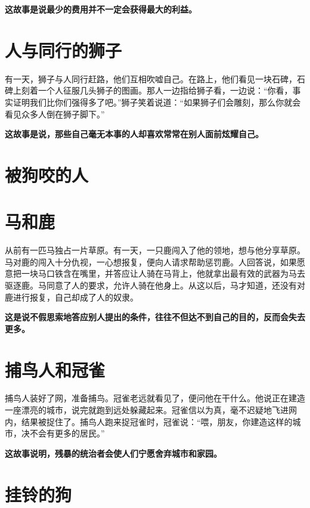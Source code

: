 {\bfseries \color{red}这故事是说最少的费用并不一定会获得最大的利益。}

\section{人与同行的狮子}

有一天，狮子与人同行赶路，他们互相吹嘘自己。在路上，他们看见一块石碑，石碑上刻着一个人征服几头狮子的图画。那人一边指给狮子看，一边说：“你看，事实证明我们比你们强得多了吧。”狮子笑着说道：“如果狮子们会雕刻，那么你就会看见众多人倒在狮子脚下。”

{\bfseries \color{red}这故事是说，那些自己毫无本事的人却喜欢常常在别人面前炫耀自己。}

\section{被狗咬的人}



{\bfseries \color{red}}

\section{马和鹿}

从前有一匹马独占一片草原。有一天，一只鹿闯入了他的领地，想与他分享草原。马对鹿的闯入十分仇视，一心想报复，便向人请求帮助惩罚鹿。人回答说，如果愿意把一块马口铁含在嘴里，并答应让人骑在马背上，他就拿出最有效的武器为马去驱逐鹿。马同意了人的要求，允许人骑在他身上。从这以后，马才知道，还没有对鹿进行报复，自己却成了人的奴隶。

{\bfseries \color{red}这是说不假思索地答应别人提出的条件，往往不但达不到自己的目的，反而会失去更多。}

\section{捕鸟人和冠雀}

捕鸟人装好了网，准备捕鸟。冠雀老远就看见了，便问他在干什么。他说正在建造一座漂亮的城市，说完就跑到远处躲藏起来。冠雀信以为真，毫不迟疑地飞进网内，结果被捉住了。捕鸟人跑来捉冠雀时，冠雀说：“喂，朋友，你建造这样的城市，决不会有更多的居民。”

{\bfseries \color{red}这故事说明，残暴的统治者会使人们宁愿舍弃城市和家园。}

\section{挂铃的狗}



